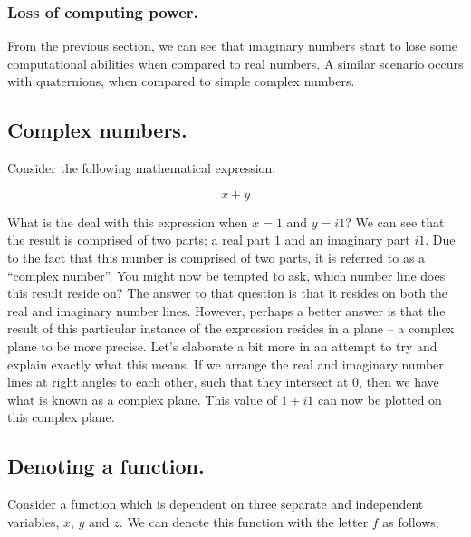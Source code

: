 \documentclass{article}
\begin{document}
\subsubsection{Loss of computing power.}

From the previous section, we can see that imaginary numbers start to lose some computational abilities when
compared to real numbers. A similar scenario occurs with quaternions, when compared to simple complex numbers. 


\subsection{Complex numbers.}

Consider the following mathematical expression;

\begin{equation*}
x + y
\end{equation*}

What is the deal with this expression when $x=1$ and $y=i1$? We can see that the result is comprised of two
parts; a real part $1$ and an imaginary part $i1$. Due to the fact that this number is comprised of two parts, it is
referred to as a ``complex number''. You might now be tempted to ask, which number line does this result reside on? The
answer to that question is that it resides on both the real and imaginary number lines. However, perhaps a better
answer is that
the result of this particular instance of the expression resides in a plane -- a complex plane to be more precise.
Let's elaborate a bit more in an attempt to try and explain exactly what this means. If we arrange the real and imaginary number
lines at right angles to each other, such that they intersect at 0, then we have what is known as a complex plane.
This value of $1 + i1$ can now be plotted on this complex plane.


\subsection{Denoting a function.}

Consider a function which is dependent on three separate and independent variables, \begin{math} x\end{math}, $y$ and 
\begin{math} z\end{math}. We can denote this function with the letter \begin{math} f \end{math} as follows;
\end{document}
